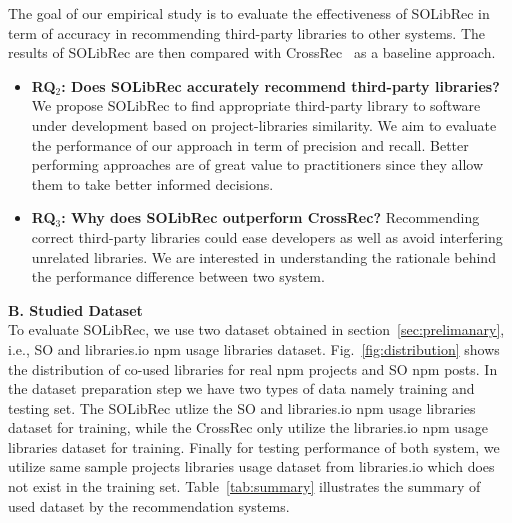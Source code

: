 \documentclass[paper]{ieice}
\newcommand{\RqTwo}{\textbf{RQ$_2$: Does SOLibRec accurately recommend third-party libraries?}}
\newcommand{\RqThree}{\textbf{RQ$_3$: Why does SOLibRec outperform CrossRec?}}
\begin{document}
The goal of our empirical study is to evaluate the effectiveness of SOLibRec in term of accuracy in recommending third-party libraries to other systems. The results of SOLibRec are then compared with CrossRec~\cite{nguyen2020crossrec} as a baseline approach.
\begin{itemize}
        
        \item{\RqTwo}
        We propose SOLibRec to find appropriate third-party library to software under development based on project-libraries similarity. We aim to evaluate the performance of our approach in term of precision and recall. Better performing approaches are of great value to practitioners since they allow them to take better informed decisions. 
         
        \item{\RqThree}
        Recommending correct third-party libraries could ease developers as well as avoid interfering unrelated libraries. We are interested in understanding the rationale behind the performance difference between two system.
        
    \end{itemize}

\noindent\textbf{B. Studied Dataset}\\

To evaluate SOLibRec, we use two dataset obtained in section~\ref{sec:prelimanary}, i.e., SO and libraries.io npm usage libraries dataset. Fig.~\ref{fig:distribution} shows the distribution of co-used libraries for real npm projects and SO npm posts.
In the dataset preparation step we have two types of data namely training and testing set. The SOLibRec utlize the SO and libraries.io npm usage libraries dataset for training, while the CrossRec only utilize the libraries.io npm usage libraries dataset for training. Finally for testing performance of both system, we utilize same sample projects libraries usage dataset from libraries.io which does not exist in the training set. Table~\ref{tab:summary} illustrates the summary of used dataset by the recommendation systems.\\
\end{document}

